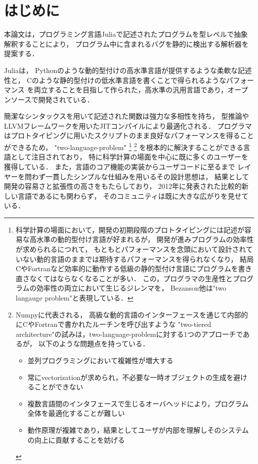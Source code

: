 
\section{はじめに}

本論文は，プログラミング言語Juliaで記述されたプログラムを型レベルで抽象解釈することにより，
プログラム中に含まれるバグを静的に検出する解析器を提案する．

Julia\cite{julia}は，
Pythonのような動的型付けの高水準言語が提供するような柔軟な記述性と，
Cのような静的型付けの低水準言語を書くことで得られるようなパフォーマンス
を両立することを目指して作られた，高水準の汎用言語であり，オープンソースで開発されている．

簡潔なシンタックスを用いて記述された関数は強力な多相性を持ち，
型推論やLLVMフレームワークを用いたJITコンパイルにより最適化される．
プログラマはプロトタイピングに用いたスクリプトのまま良好なパフォーマンスを得ることができるため，
"two-language-problem"
\footnote{
  科学計算の場面において，開発の初期段階のプロトタイピングには記述が容易な高水準の動的型付け言語が好まれるが，
  開発が進みプログラムの効率性が求められるにつれて，
  もともとパフォーマンスを念頭において設計されていない動的言語のままでは期待するパフォーマンスを得られなくなり，
  結局CやFortranなど効率的に動作する低級の静的型付け言語にプログラムを書き直さなくてはならなくなることが多い．
  この，プログラマの生産性とプログラムの効率性の両立において生じるジレンマを，
  Bezanson他は"two langauge problem"\cite{julia-2012, Julia-2017}と表現している．
}
\footnote{
  Numpy\cite{numpy}に代表される，
  高級な動的言語のインターフェースを通じて内部的にCやFortranで書かれたルーチンを呼び出すような
  "two-tiered architecture"の試みは，two-language-problemに対する1つのアプローチであるが，
  以下のような問題点を持っている\cite{julia-2012}．
  \begin{itemize}
    \item 並列プログラミングにおいて複雑性が増大する
    \item 常にvectorizationが求められ，不必要な一時オブジェクトの生成を避けることができない
    \item 複数言語間のインタフェースで生じるオーバヘッドにより，プログラム全体を最適化することが難しい
    \item 動作原理が複雑であり，結果としてユーザが内部を理解しそのシステムの向上に貢献することを妨げる
  \end{itemize}
}
を根本的に解決することができる言語として注目されており，
特に科学計算の場面を中心に既に多くのユーザーを獲得している\cite{julia-growth}．
また，言語のコア機能の実装からユーザコードに至るまで
レイヤーを問わず一貫したシンプルな仕組みを用いるその設計思想は，
結果として開発の容易さと拡張性の高さをもたらしており\cite{julia-2012}，
2012年に発表された比較的新しい言語であるにも関わらず，
そのコミュニティは既に大きな広がりを見せている．

